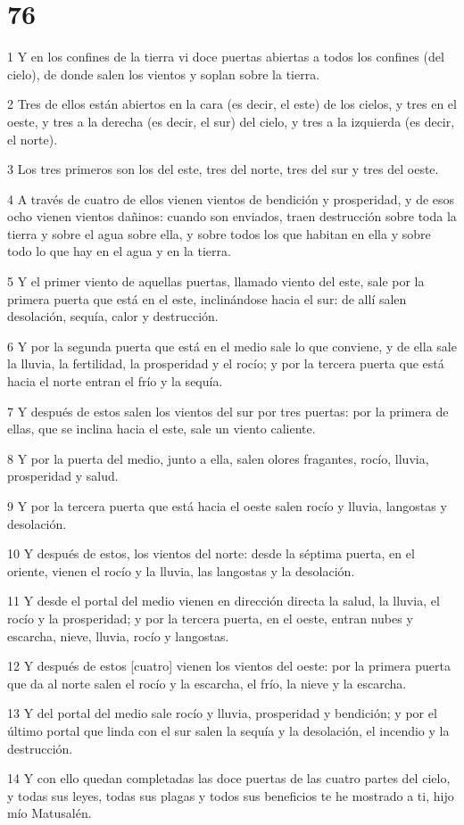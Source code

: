 \chapter{76}

\par 1 Y en los confines de la tierra vi doce puertas abiertas a todos los confines (del cielo), de donde salen los vientos y soplan sobre la tierra.
\par 2 Tres de ellos están abiertos en la cara (es decir, el este) de los cielos, y tres en el oeste, y tres a la derecha (es decir, el sur) del cielo, y tres a la izquierda (es decir, el norte).
\par 3 Los tres primeros son los del este, tres del norte, tres del sur y tres del oeste.
\par 4 A través de cuatro de ellos vienen vientos de bendición y prosperidad, y de esos ocho vienen vientos dañinos: cuando son enviados, traen destrucción sobre toda la tierra y sobre el agua sobre ella, y sobre todos los que habitan en ella y sobre todo lo que hay en el agua y en la tierra.
\par 5 Y el primer viento de aquellas puertas, llamado viento del este, sale por la primera puerta que está en el este, inclinándose hacia el sur: de allí salen desolación, sequía, calor y destrucción.
\par 6 Y por la segunda puerta que está en el medio sale lo que conviene, y de ella sale la lluvia, la fertilidad, la prosperidad y el rocío; y por la tercera puerta que está hacia el norte entran el frío y la sequía.
\par 7 Y después de estos salen los vientos del sur por tres puertas: por la primera de ellas, que se inclina hacia el este, sale un viento caliente.
\par 8 Y por la puerta del medio, junto a ella, salen olores fragantes, rocío, lluvia, prosperidad y salud.
\par 9 Y por la tercera puerta que está hacia el oeste salen rocío y lluvia, langostas y desolación.
\par 10 Y después de estos, los vientos del norte: desde la séptima puerta, en el oriente, vienen el rocío y la lluvia, las langostas y la desolación.
\par 11 Y desde el portal del medio vienen en dirección directa la salud, la lluvia, el rocío y la prosperidad; y por la tercera puerta, en el oeste, entran nubes y escarcha, nieve, lluvia, rocío y langostas.
\par 12 Y después de estos [cuatro] vienen los vientos del oeste: por la primera puerta que da al norte salen el rocío y la escarcha, el frío, la nieve y la escarcha.
\par 13 Y del portal del medio sale rocío y lluvia, prosperidad y bendición; y por el último portal que linda con el sur salen la sequía y la desolación, el incendio y la destrucción.
\par 14 Y con ello quedan completadas las doce puertas de las cuatro partes del cielo, y todas sus leyes, todas sus plagas y todos sus beneficios te he mostrado a ti, hijo mío Matusalén.

